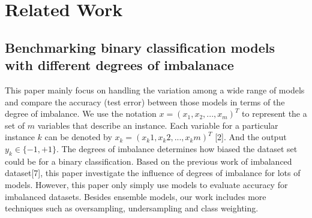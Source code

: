 \documentclass{article}
\begin{document}
\section{Related Work}
\label{gen_inst}
\subsection{Benchmarking binary classification models with different degrees of imbalanace}

This paper mainly focus on handling the variation among a wide range of models and compare the accuracy (test error) between those models in terms of the degree of imbalance. We use the notation $x = (x_1, x_2,...,x_m)^T$ to represent the a set of $m$ variables that describe an instance. Each variable for a particular instance $k$ can be denoted by $x_k = (x_k1, x_k2,...,x_km)^T$ [2]. And the output $y_k \in \{-1, +1\}$. The degrees of imbalance determines how biased the dataset set could be for a binary classification. Based on the previous work of imbalanced dataset[7], this paper investigate the influence of degrees of imbalance for lots of models. However, this paper only simply use models to evaluate accuracy for imbalanced datasets. Besides ensemble models, our work includes more techniques such as oversampling, undersampling and class weighting.
\end{document}
